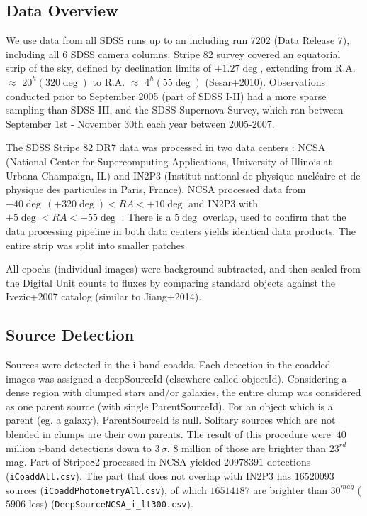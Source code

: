 \documentclass[fleqn,usenatbib]{mnras}  %
\begin{document}
\subsection{Data Overview}
We use data from all SDSS runs up to an including run 7202 (Data Release 7), including all 6 SDSS camera columns. Stripe 82 survey covered an equatorial strip of the sky, defined by declination limits of $\pm1.27\deg$, extending from R.A. $\approx$ $20^{h} (320 \deg)$ to R.A.  $\approx$ $4^{h} (55 \deg)$ (Sesar+2010). Observations conducted prior to September 2005 (part of SDSS I-II) had a more sparse sampling than SDSS-III, and the SDSS Supernova Survey, which ran between September 1st - November 30th each year between 2005-2007. 

The SDSS Stripe 82 DR7  data  was processed in two data centers : NCSA (National Center for Supercomputing Applications, University of Illinois at Urbana-Champaign, IL) and IN2P3  (Institut national de physique nucl\'eaire et de physique des particules in Paris, France). NCSA processed data from $-40 \deg \, (+320 \deg) < RA < +10 \deg $ and IN2P3 with $ +5 \deg < RA < +55 \deg$ . There is a $5 \deg$ overlap, used to confirm that the data processing pipeline in both data centers yields identical data products. The entire strip was split into smaller patches

All epochs (individual images) were background-subtracted, and then scaled from the Digital Unit counts to fluxes by comparing standard objects against the Ivezic+2007 catalog  (similar to  Jiang+2014).   

\subsection{Source Detection}
Sources were detected in the i-band coadds. Each detection in the coadded images was assigned a deepSourceId (elsewhere called objectId). Considering  a dense region with clumped stars and/or galaxies, the entire clump was considered as one parent source (with single ParentSourceId). For an object which is a parent (eg. a galaxy), ParentSourceId is null. Solitary sources which are not blended  in clumps are their own parents. The result of this procedure were $~40$ million  i-band detections down to $3 \, \sigma$.  $8$ million of those are brighter than $23^{rd}$ mag. Part of Stripe82 processed in NCSA yielded  $20978391$ detections (\verb|iCoaddAll.csv|). The part that does not overlap with IN2P3 has   $16520093$ sources (\verb|iCoaddPhotometryAll.csv|), of which  $16514187$ are brighter than $30^{mag}$  ($5906$ less) (\verb|DeepSourceNCSA_i_lt300.csv|).
\end{document}

